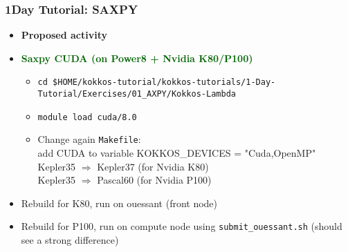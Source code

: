 \begin{frame}[fragile=singleslide]
  \frametitle{1Day Tutorial: SAXPY}

  \begin{itemize}
  \item \textbf{Proposed activity}
  \item \textcolor{darkgreen}{\textbf{Saxpy CUDA (on Power8 + Nvidia K80/P100)}}
    \begin{itemize}
    \item \texttt{cd \$HOME/kokkos-tutorial/kokkos-tutorials/1-Day-Tutorial/Exercises/01\_AXPY/Kokkos-Lambda}
    \item \texttt{module load cuda/8.0}
    \item Change again \texttt{Makefile}: \\
      add CUDA to variable KOKKOS\_DEVICES = "Cuda,OpenMP"\\
      Kepler35 $\Rightarrow$ Kepler37 (for Nvidia K80)\\
      Kepler35 $\Rightarrow$ Pascal60 (for Nvidia P100)
    \end{itemize}
  \item Rebuild for K80, run on ouessant (front node)
  \item Rebuild for P100, run on compute node using \texttt{submit\_ouessant.sh} (should see a strong difference)
  \end{itemize}

\end{frame}
